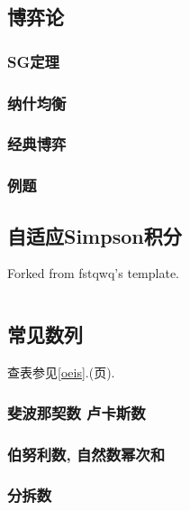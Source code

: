 \documentclass[a4paper, twoside]{article}
\begin{document}
\begin{multicols}{2}
			\subsection{博弈论}
				\subsubsection{SG定理}
					

				\subsubsection{纳什均衡}
					

				\subsubsection{经典博弈}
					\label{classicgame}
					

				\subsubsection{例题}
					

			\subsection{自适应Simpson积分}
				Forked from fstqwq's template.
				\inputminted{cpp}{../src/math/simpson.cpp}

			\subsection{常见数列}
				查表参见\ref{oeis}.(\pageref{oeis}页).

				\subsubsection{斐波那契数 卢卡斯数}
					

				\subsubsection{伯努利数, 自然数幂次和}
					\label{bernoulli}
					
				
				\subsubsection{分拆数}
					\inputminted{cpp}{../src/math/分拆数.cpp}
				

\end{multicols}
\end{document}
